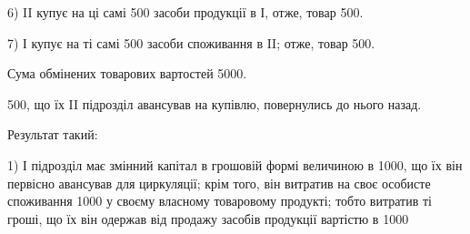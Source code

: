 6) II купує на ці самі 500 засоби продукції в І, отже,
товар \deq{} 500.

7) І купує на ті самі 500 засоби споживання в II; отже,
товар \deq{} 500.

Сума обмінених товарових вартостей \deq{} 5000.

500, що їх II підрозділ авансував на купівлю, повернулись
до нього назад.

Результат такий:

1) І підрозділ має змінний капітал в грошовій формі величиною в 1000, що їх він первісно авансував для циркуляції; крім того, він витратив
на своє особисте споживання 1000 у своєму власному
товаровому продукті; тобто витратив ті гроші, що їх він одержав від продажу
засобів продукції вартістю в 1000
